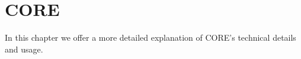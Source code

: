 
\chapter{CORE}
\label{ch:core}

In this chapter we offer a more detailed explanation of CORE's technical details and usage.

